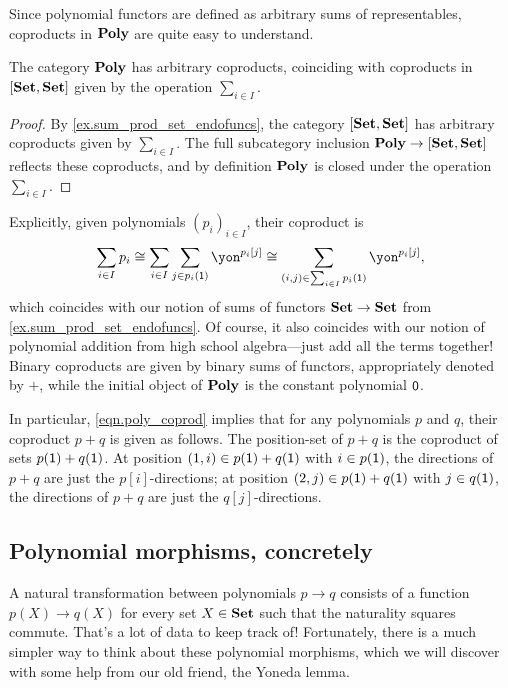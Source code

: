 \documentclass[Book-Poly]{subfiles}
\begin{document}
Since polynomial functors are defined as arbitrary sums of representables, coproducts in $\mathbf{Poly}$ are quite easy to understand.

\begin{proposition} \label{prop.poly_coprods}
The category $\mathbf{Poly}$ has arbitrary coproducts, coinciding with coproducts in $[\mathbf{Set},\mathbf{Set}]$ given by the operation $\sum_{i \in I}$.
\end{proposition}
\begin{proof}
By \cref{ex.sum_prod_set_endofuncs}, the category $[\mathbf{Set},\mathbf{Set}]$ has arbitrary coproducts given by $\sum_{i \in I}$.
The full subcategory inclusion $\mathbf{Poly} \to [\mathbf{Set},\mathbf{Set}]$ reflects these coproducts, and by definition $\mathbf{Poly}$ is closed under the operation $\sum_{i \in I}$.
\end{proof}

Explicitly, given polynomials $(p_i)_{i \in I}$, their coproduct is
\begin{equation} \label{eqn.poly_coprod}
    \sum_{i \in I} p_i \iso \sum_{i \in I} \sum_{j \in p_i(\1)} \yon^{p_i[j]} \iso \sum_{(i,j) \in \sum_{i \in I} p_i(\1)} \yon^{p_i[j]},
\end{equation}
which coincides with our notion of sums of functors $\mathbf{Set} \to \mathbf{Set}$ from \cref{ex.sum_prod_set_endofuncs}.
Of course, it also coincides with our notion of polynomial addition from high school algebra---just add all the terms together!
Binary coproducts are given by binary sums of functors, appropriately denoted by $+$, while the initial object of $\mathbf{Poly}$ is the constant polynomial $\textsf{0}$.

In particular, \eqref{eqn.poly_coprod} implies that for any polynomials $p$ and $q$, their coproduct $p+q$ is given as follows.
The position-set of $p+q$ is the coproduct of sets $p(\textsf{1}) + q(\textsf{1})$.
At position $(1,i) \in p(\textsf{1}) + q(\textsf{1})$ with $i \in p(\textsf{1})$, the directions of $p+q$ are just the $p[i]$-directions; at position $(2,j) \in p(\textsf{1}) + q(\textsf{1})$ with $j \in q(\textsf{1})$, the directions of $p+q$ are just the $q[j]$-directions.

\subsection{Polynomial morphisms, concretely} \label{subsec.poly.func_nat.morph.concrete}

A natural transformation between polynomials $p \to q$ consists of a function $p(X) \to q(X)$ for every set $X \in \mathbf{Set}$ such that the naturality squares commute.
That's a lot of data to keep track of!
Fortunately, there is a much simpler way to think about these polynomial morphisms, which we will discover with some help from our old friend, the Yoneda lemma.
\end{document}
